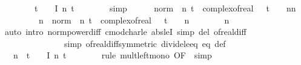 {\ \ \ \ \ \ \ \ {\isacharquery}t\ {\isacharslash}\ {}\ {\isacharasterisk}\ {\isacharquery}I\ n\ t{\isachardoublequoteclose}\isanewline
\ \ \ \ \ \ \isamarkupfalse%
\ simp\isanewline
\isanewline
\ \ \ \ \isamarkupfalse%
\ {\isachardoublequoteopen}norm\ {\isacharparenleft}{\isasymphi}\ n\ t\ {\isacharminus}\ {\isacharparenleft}complex{\isacharunderscore}of{\isacharunderscore}real\ {\isacharparenleft}{}\ {\isacharplus}\ {\isacharparenleft}{\isacharminus}{\isacharparenleft}t{\isacharcircum}{}{\isacharparenright}\ {\isacharslash}\ {}{\isacharparenright}\ {\isacharslash}\ n{\isacharparenright}{\isacharparenright}{\isacharcircum}n{\isacharparenright}\ {\isasymle}\isanewline
\ \ \ \ \ \ \ \ \ n\ {\isacharasterisk}\ norm\ {\isacharparenleft}{\isasympsi}\ n\ t\ {\isacharminus}\ {\isacharparenleft}complex{\isacharunderscore}of{\isacharunderscore}real\ {\isacharparenleft}{}\ {\isacharplus}\ {\isacharparenleft}{\isacharminus}{\isacharparenleft}t{\isacharcircum}{}{\isacharparenright}\ {\isacharslash}\ {}{\isacharparenright}\ {\isacharslash}\ n{\isacharparenright}{\isacharparenright}{\isacharparenright}{\isachardoublequoteclose}\isanewline
\ \ \ \ \ \ \isamarkupfalse%
\ n\isanewline
\ \ \ \ \ \ \isamarkupfalse%
\ {\isacharparenleft}auto\ intro{\isacharbang}{\isacharcolon}\ norm{\isacharunderscore}power{\isacharunderscore}diff\ {\isasymmu}{\isachardot}cmod{\isacharunderscore}char{\isacharunderscore}le{\isacharunderscore}{}\ abs{\isacharunderscore}leI\ simp\ del{\isacharcolon}\ of{\isacharunderscore}real{\isacharunderscore}diff\isanewline
\ \ \ \ \ \ \ \ \ \ \ \ \ \ \ simp{\isacharcolon}\ of{\isacharunderscore}real{\isacharunderscore}diff{\isacharbrackleft}symmetric{\isacharbrackright}\ divide{\isacharunderscore}le{\isacharunderscore}eq\ {\isasymphi}{\isacharunderscore}eq\ {\isasympsi}{\isacharunderscore}def{\isacharparenright}\isanewline
\ \ \ \ \isamarkupfalse%
\ \isamarkupfalse%
\ {\isachardoublequoteopen}{\isasymdots}\ {\isasymle}\ n\ {\isacharasterisk}\ {\isacharparenleft}{\isacharquery}t\ {\isacharslash}\ {}\ {\isacharasterisk}\ {\isacharquery}I\ n\ t{\isacharparenright}{\isachardoublequoteclose}\isanewline
\ \ \ \ \ \ \isamarkupfalse%
\ {\isacharparenleft}rule\ mult{\isacharunderscore}left{\isacharunderscore}mono\ {\isacharbrackleft}OF\ {\isacharasterisk}{\isacharasterisk}{\isacharbrackright}{\isacharcomma}\ simp{\isacharparenright}\isanewline
}
